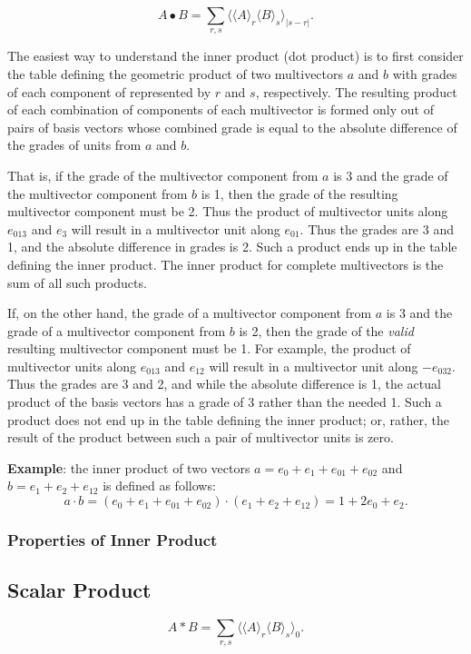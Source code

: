 \documentclass{article}
\begin{document}
$$A\bullet B = \sum_{r,s} \langle \langle A \rangle_{r} \langle B \rangle_{s} \rangle_{\vert s - r \vert}.$$

The easiest way to understand the inner product (dot product) is to first consider the table defining the geometric product 
of two multivectors $a$ and $b$ with grades of each component of represented by $r$ and $s$, respectively.
The resulting product of each combination of components of each multivector is formed only out of pairs of basis 
vectors whose combined grade is equal to the absolute difference of the grades of units from $a$ and $b$.

That is, if the grade of the multivector component from $a$ is 3 and the grade of the multivector component from $b$ is 1, 
then the grade of the resulting multivector component must be 2. Thus the product of multivector units along $e_{013}$ and $e_{3}$
will result in a multivector unit along $e_{01}$. Thus the grades are 3 and 1, and the absolute difference in grades is 2. Such a product
ends up in the table defining the inner product. The inner product for complete multivectors is the sum of all such products. 

If, on the other hand, the grade of a multivector component from $a$ is 3 and the grade of a multivector component from $b$ is 2, 
then the grade of the \textit{valid} resulting multivector component must be 1. 
For example, the product of multivector units along $e_{013}$ and $e_{12}$ will result in a multivector unit 
along $-e_{032}$. Thus the grades are 3 and 2, and while the absolute difference is 1, the actual
product of the basis vectors has a grade of 3 rather than the needed 1. Such a product does not end up in the table defining the inner product; 
or, rather, the result of the product between such a pair of multivector units is zero.

\textbf{Example}: the inner product of two vectors $a = e_0 + e_1 + e_{01} + e_{02}$ and $b = e_1 + e_2 + e_{12}$ 
is defined as follows: $$a \cdot b = (e_0 + e_1 + e_{01} + e_{02}) \cdot (e_1 + e_2 + e_{12}) = 1 + 2e_0 + e_2.$$

\subsubsection{\textbf{Properties of Inner Product}}


\subsection{\textbf{Scalar Product}}
$$ A * B = \sum_{r,s} \langle \langle A \rangle_{r} \langle B \rangle_{s} \rangle_{0}.$$
\end{document}
